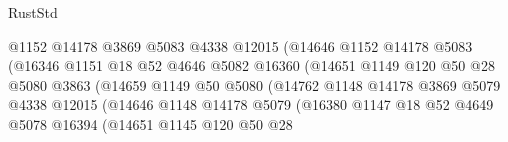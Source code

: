 \begin{lexlean}{RustStd}
\begin{coremodule}
                                      @1152
                                      @14178
                                      @3869
                                      @5083
                                      @4338
                                      @12015
                                      (@14646
                                        @1152
                                        @14178
                                        @5083
                                        (@16346
                                          @1151
                                          @18
                                          @52
                                          @4646
                                          @5082
                                          @16360
                                          (@14651
                                            @1149
                                            @120
                                            @50
                                            @28
                                            @5080
                                            @3863
                                            (@14659
                                              @1149
                                              @50
                                              @5080
                                              (@14762
                                                @1148
                                                @14178
                                                @3869
                                                @5079
                                                @4338
                                                @12015
                                                (@14646
                                                  @1148
                                                  @14178
                                                  @5079
                                                  (@16380
                                                    @1147
                                                    @18
                                                    @52
                                                    @4649
                                                    @5078
                                                    @16394
                                                    (@14651
                                                      @1145
                                                      @120
                                                      @50
                                                      @28

\end{coremodule}
\end{lexlean}
